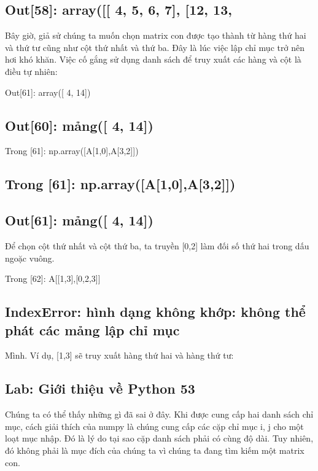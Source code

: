 \subsection{Out[58]: array([[ 4, 5, 6, 7], [12, 13,}

Bây giờ, giả sử chúng ta muốn chọn matrix con được tạo thành từ hàng thứ hai và thứ tư cũng như cột thứ nhất và thứ ba. Đây là lúc việc lập chỉ mục trở nên hơi khó khăn. Việc cố gắng sử dụng danh sách để truy xuất các hàng và cột là điều tự nhiên:

Out[61]: array([ 4, 14])

\subsection{Out[60]: mảng([ 4, 14])}

Trong [61]: np.array([A[1,0],A[3,2]])

\subsection{Trong [61]: np.array([A[1,0],A[3,2]])}

\subsection{Out[61]: mảng([ 4, 14])}

Để chọn cột thứ nhất và cột thứ ba, ta truyền [0,2] làm đối số thứ hai trong dấu ngoặc vuông.

Trong [62]: A[[1,3],[0,2,3]]

\subsection{IndexError: hình dạng không khớp: không thể phát các mảng lập chỉ mục}

Mình. Ví dụ, [1,3] sẽ truy xuất hàng thứ hai và hàng thứ tư:

\subsection{Lab: Giới thiệu về Python 53}

Chúng ta có thể thấy những gì đã sai ở đây. Khi được cung cấp hai danh sách chỉ mục, cách giải thích của numpy là chúng cung cấp các cặp chỉ mục i, j cho một loạt mục nhập. Đó là lý do tại sao cặp danh sách phải có cùng độ dài. Tuy nhiên, đó không phải là mục đích của chúng ta vì chúng ta đang tìm kiếm một matrix con.

